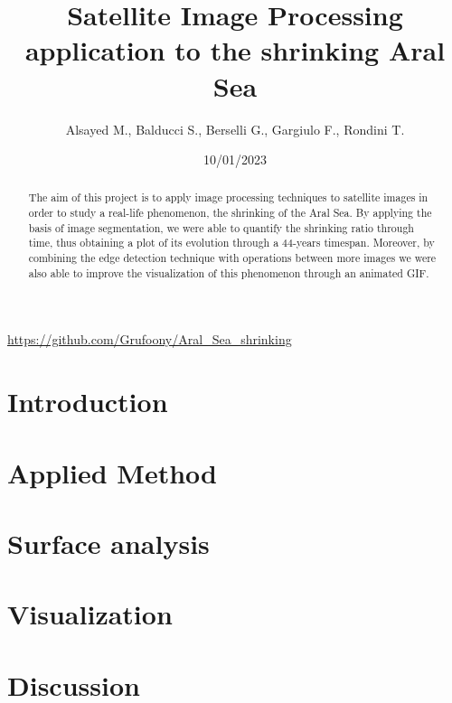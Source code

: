 \documentclass[12pt,a4paper]{article}
\title{Satellite Image Processing application to the shrinking Aral Sea}
\author{Alsayed M., Balducci S., Berselli G., Gargiulo F., Rondini T.}
\date{10/01/2023}
\begin{document}
\maketitle
\begin{center}
	\url{https://github.com/Grufoony/Aral_Sea_shrinking}
\end{center}

\begin{abstract}
    The aim of this project is to apply image processing techniques to satellite images in order to study a real-life phenomenon, the shrinking of the Aral Sea.
    By applying the basis of image segmentation, we were able to quantify the shrinking ratio through time, thus obtaining a plot of its evolution through a 44-years timespan.
    Moreover, by combining the edge detection technique with operations between more images we were also able to improve the visualization of this phenomenon through an animated GIF.
\end{abstract}
\thispagestyle{empty}

\newpage
\thispagestyle{empty}
\addtocounter{page}{-2}
\mbox{}

\tableofcontents
\pagebreak

\section*{Introduction}

\pagebreak

\section{Applied Method}

\pagebreak

\section{Surface analysis}

\pagebreak

\section{Visualization}

\pagebreak

\section{Discussion}


\newpage
\thispagestyle{empty}
\mbox{}

\appendix
\end{document}
